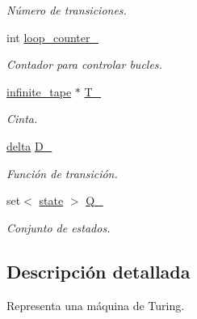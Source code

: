 \begin{DoxyCompactItemize}
\begin{DoxyCompactList}\small\item\em Número de transiciones. \end{DoxyCompactList}\item 
\hypertarget{classturing__machine_a44915543f4eb338007d79a0cc4eefe01}{}int \hyperlink{classturing__machine_a44915543f4eb338007d79a0cc4eefe01}{loop\+\_\+counter\+\_\+}\label{classturing__machine_a44915543f4eb338007d79a0cc4eefe01}

\begin{DoxyCompactList}\small\item\em Contador para controlar bucles. \end{DoxyCompactList}\item 
\hypertarget{classturing__machine_af317bfb8bbafd64728ad1d0810ab8bda}{}\hyperlink{classinfinite__tape}{infinite\+\_\+tape} $\ast$ \hyperlink{classturing__machine_af317bfb8bbafd64728ad1d0810ab8bda}{T\+\_\+}\label{classturing__machine_af317bfb8bbafd64728ad1d0810ab8bda}

\begin{DoxyCompactList}\small\item\em Cinta. \end{DoxyCompactList}\item 
\hypertarget{classturing__machine_a15e84a3fa93b3bc68d243a1e4d2c3d9b}{}\hyperlink{classdelta}{delta} \hyperlink{classturing__machine_a15e84a3fa93b3bc68d243a1e4d2c3d9b}{D\+\_\+}\label{classturing__machine_a15e84a3fa93b3bc68d243a1e4d2c3d9b}

\begin{DoxyCompactList}\small\item\em Función de transición. \end{DoxyCompactList}\item 
\hypertarget{classturing__machine_a27484c782baa3661e2363e5f4c2e3525}{}set$<$ \hyperlink{classstate}{state} $>$ \hyperlink{classturing__machine_a27484c782baa3661e2363e5f4c2e3525}{Q\+\_\+}\label{classturing__machine_a27484c782baa3661e2363e5f4c2e3525}

\begin{DoxyCompactList}\small\item\em Conjunto de estados. \end{DoxyCompactList}\end{DoxyCompactItemize}


\subsection{Descripción detallada}
Representa una máquina de Turing. 

